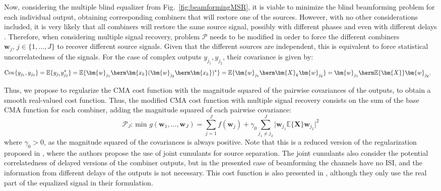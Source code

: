 Now, considering the multiple blind equalizer from Fig.~\ref{fig:beamformingMSR}, it is viable to minimize the blind beamforming problem for each individual output, obtaining corresponding combiners that will restore one of the sources. However, with no other considerations included, it is very likely that all combiners will restore the same source signal, possibly with different phases and even with different delays \cite{Ding2000}. Therefore, when considering multiple signal recovery, problem $\mathcal{P}$ needs to be modified in order to force the different combiners $\bm{w}_j,\,j\in\{1,\ldots,J\}$ to recover different source signals. Given that the different sources are independent, this is equivalent to force statistical uncorrelatedness of the signals. For the case of complex outputs $y_{j_1},y_{j_2}$, their covariance is given by:
\begin{align}
\mathrm{Cov}\{y_{j_1},y_{j_2}\}
&=\mathbb{E}\{y_{j_1}y_{j_2}^*\}
=\mathbb{E}\{ \bm{w}_{j_1}\herm\bm{x_k}(\bm{w}_{j_2}\herm\bm{x_k})^*\}
=\mathbb{E}\{ \bm{w}_{j_1}\herm\bm{X}_k\bm{w}_{j_2}\}=\bm{w}_{j_1}\herm\mathbb{E}\{\bm{X}\}\bm{w}_{j_2}.
\end{align}

Thus, we propose to regularize the CMA cost function with the magnitude squared of the pairwise covariances of the outputs, to obtain a smooth real-valued cost function. Thus, the modified CMA cost function with multiple signal recovery consists on the sum of the base CMA function for each combiner, adding the magnitude squared of each pairwise covariance: 
\begin{equation}
\mathcal{P}_J:\,\text{min}\,\, g(\bm{w}_1,\ldots,\bm{w}_J)=\sum_{j=1}^Jf(\bm{w}_j) +\gamma_0\sum_{j_1\neq j_2}^J\big|\bm{w}_{j_1}\mathbb{E}\{\bm{X}\}\bm{w}_{j_2}\big|^2 \label{eqn:cma_msr}
\end{equation}
where $\gamma_0>0$, as the magnitude squared of the covariances is always positive.  
Note that this is a reduced version of the regularization proposed in \cite{Chen1991crimno,Li1998adaptivemimocma}, where the authors propose the use of joint cumulants for source separation. The joint cumulants also consider the potential correlatedness of delayed versions of the combiner outputs, but in the presented case of beamforming the channels have no ISI, and the information from different delays of the outputs is not necessary. This cost function is also presented in \cite{Ikhlef2007simplifiedmimocma}, although they only use the real part of the equalized signal in their formulation.

